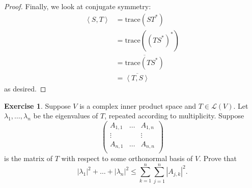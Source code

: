 \documentclass{article}
\theoremstyle{definition}
\newtheorem{ex}{Exercise}
\begin{document}
\begin{proof}
	Finally, we look at conjugate symmetry: \begin{align*}
		\left\langle S, T \right\rangle & = \mathrm{trace}(ST^*)                       \\
		                                & = \mathrm{trace}((TS^*)^*)                   \\
		                                & = \overline{\mathrm{trace}(TS^*)}            \\
		                                & = \overline{\left\langle T, S \right\rangle}
	\end{align*}
	as desired.
\end{proof}

\begin{ex}
	Suppose $V$ is a complex inner product space and $T \in \mathcal{L}(V)$.
	Let $\lambda_1, \dots, \lambda_n$ be the eigenvalues of $T$, repeated according to multiplicity.
	Suppose \begin{equation*}
		\begin{pmatrix}
			A_{1, 1} & \dots & A_{1, n} \\
			\vdots   &       & \vdots   \\
			A_{n, 1} & \dots & A_{n, n} \\
		\end{pmatrix}
	\end{equation*}
	is the matrix of $T$ with respect to some orthonormal basis of $V$.
	Prove that \begin{equation*}
		|\lambda_1|^2 + \dots + |\lambda_n|^2 \leq \sum _{k = 1}^{n} \sum _{j = 1}^{n}|A_{j, k}|^2.
	\end{equation*}
\end{ex}
\end{document}
